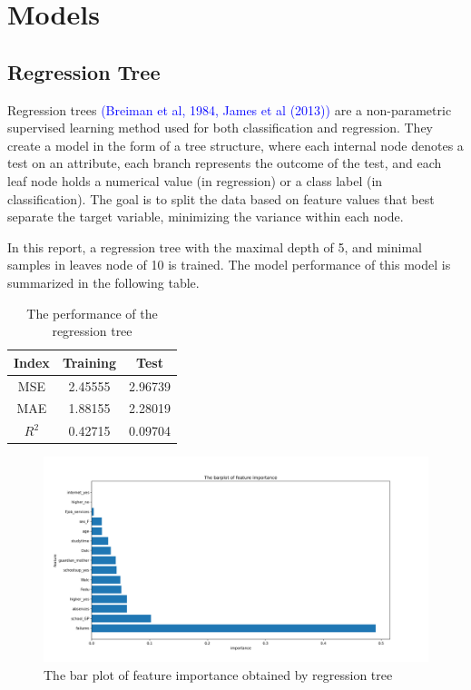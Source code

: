 \documentclass[sn-mathphys-num]{sn-jnl}%
\theoremstyle{thmstyleone}%
\theoremstyle{thmstyletwo}%
\theoremstyle{thmstylethree}%
\begin{document}
\clearpage
\section{Models}

\subsection{Regression Tree}

Regression trees \textcolor{blue}{(Breiman et al, 1984, James et al (2013))}  are a non-parametric supervised learning method used for both classification and regression. They create a model in the form of a tree structure, where each internal node denotes a test on an attribute, each branch represents the outcome of the test, and each leaf node holds a numerical value (in regression) or a class label (in classification). The goal is to split the data based on feature values that best separate the target variable, minimizing the variance within each node.

In this report, a regression tree with the maximal depth of 5, and minimal samples in leaves node of 10 is trained. The model performance of this model is summarized in the following table.

\begin{table}[h]
  \centering
  \caption{The performance of the regression tree }
  \begin{tabular}{c|c|c}
  \hline
   Index  &  Training  & Test\\
   \hline
   MSE  &  2.45555  & 2.96739 \\
   \hline
   MAE  &  1.88155  & 2.28019\\
   \hline
   $R^2$  &  0.42715  & 0.09704 \\
   \hline
  \end{tabular}
\end{table}

\begin{figure}[h]
    \centering
    \includegraphics[width=\textwidth]{figure/feature_importance_regression_tree.png}
    \caption{The bar plot of feature importance obtained by regression tree}
\end{figure}
\end{document}
